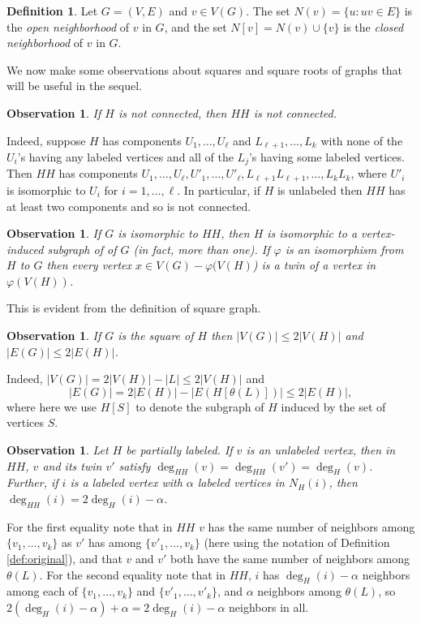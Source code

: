 \documentclass{article}
\newtheorem{observation}[theorem]{Observation}
\theoremstyle{definition}
\newtheorem{definition}[theorem]{Definition}
\begin{document}
\begin{definition} \rm Let $G=(V,E)$ and $v\in V(G)$. The set $N(v)=\{u:uv \in E\}$ is the \emph{open neighborhood} of $v$ in $G$, and the set $N[v]=N(v) \cup \{v\}$ is the \emph{closed neighborhood} of $v$ in $G$.
\end{definition} 

We now make some observations about squares and square roots of graphs that will be useful in the sequel.

\begin{observation} \rm \label{obs:connected} 
If $H$ is not connected, then $HH$ is not connected. 
\end{observation}
\noindent Indeed, suppose $H$ has components $U_1, \ldots, U_\ell$ and $L_{\ell+1}, \ldots, L_k$ with none of the $U_i$'s having any labeled vertices and all of the $L_j$'s having some labeled vertices. Then $HH$ has components $U_1, \ldots, U_\ell, U'_1, \ldots, U'_\ell, L_{\ell+1}L_{\ell+1}, \ldots, L_kL_k$, where $U'_i$ is isomorphic to $U_i$ for $i=1, \ldots, \ell$. In particular, if $H$ is unlabeled then $HH$ has at least two components and so is not connected. 

\begin{observation} \rm \label{obs:subgraph} 
If $G$ is isomorphic to $HH$, then $H$ is isomorphic to a vertex-induced subgraph of of $G$ (in fact, more than one).  If $\varphi$ is an isomorphism from $H$ to $G$ then every vertex $x\in V(G)-\varphi(V(H)$) is a twin of a vertex in $\varphi(V(H))$.
\end{observation} 
\noindent This is evident from the definition of square graph.

\begin{observation} \rm \label{obs:two-times} 
If $G$ is the square of $H$ then $|V(G)| \leq 2|V(H)|$ and $|E(G)| \leq 2|E(H)|$.
\end{observation}
\noindent Indeed, $|V(G)|=2|V(H)|-|L|\leq 2|V(H)|$ and 
$$
|E(G)|= 2|E(H)|-|E(H[\theta(L)])|\leq 2|E(H)|,
$$ 
where here we use $H[S]$ to denote the subgraph of $H$ induced by the set of vertices $S$. 

\begin{observation} \rm \label{obs:deg} \rm 
Let $H$ be partially labeled. If $v$ is an unlabeled vertex, then in $HH$, $v$ and its twin $v'$ satisfy $\deg_{HH}(v)=\deg_{HH}(v')=\deg_H(v)$. Further, if $i$ is a labeled vertex with $\alpha$ labeled vertices in $N_H(i)$, then $\deg_{HH}(i)=2\deg_H(i)-\alpha$. 
\end{observation} 
\noindent For the first equality note that in $HH$ $v$ has the same number of neighbors among $\{v_1, \ldots, v_k\}$ as $v'$ has among $\{v'_1, \ldots, v_k\}$ (here using the notation of Definition \ref{def:original}), and that $v$ and $v'$ both have the same number of neighbors among $\theta(L)$. For the second equality note that in $HH$, $i$ has $\deg_H(i)-\alpha$ neighbors among each of $\{v_1, \ldots, v_k\}$ and $\{v'_1, \ldots, v'_k\}$, and $\alpha$ neighbors among $\theta(L)$, so $2(\deg_H(i)-\alpha)+\alpha = 2\deg_H(i)-\alpha$ neighbors in all.      
\end{document}
